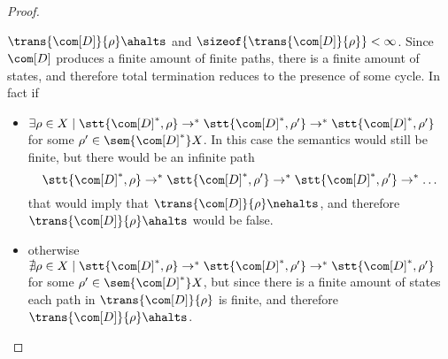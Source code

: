 \begin{proof}
\begin{itemize}
    \(\trans{\com[D]}{\rho} \ahalts\) and
    \(\sizeof{\trans{\com[D]}{\rho}} < \infty\). Since \(\com[D]\)
    produces a finite amount of finite paths, there is a finite amount
    of states, and therefore total termination reduces to the presence
    of some cycle. In fact if
    \begin{itemize}
    \item
      \(\exists \rho \in X \mid \stt{\com[D]^*, \rho} \to^*
      \stt{\com[D]^*, \rho'} \to^* \stt{\com[D]^*, \rho'}\) for some
      \(\rho'\in \sem{\com[D]^*}X\). In this case the semantics would
      still be finite, but there would be an infinite path
      \[\stt{\com[D]^*, \rho} \to^* \stt{\com[D]^*, \rho'} \to^*
        \stt{\com[D]^*, \rho'} \to^* \dots\] that would imply that
      \(\trans{\com[D]}{\rho} \nehalts\), and therefore
      \(\trans{\com[D]}{\rho} \ahalts\) would be false.
    \item otherwise
      \(\nexists \rho \in X \mid \stt{\com[D]^*, \rho} \to^*
      \stt{\com[D]^*, \rho'} \to^* \stt{\com[D]^*, \rho'}\) for some
      \(\rho'\in \sem{\com[D]^*}X\), but since there is a finite
      amount of states each path in \(\trans{\com[D]}{\rho}\) is
      finite, and therefore \(\trans{\com[D]}{\rho}\ahalts\).
    \end{itemize}
  \end{itemize}
\end{proof}
